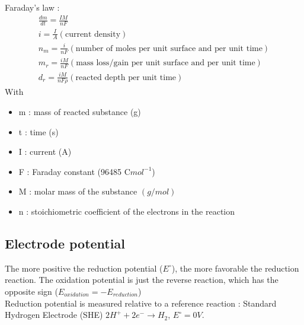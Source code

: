 \documentclass[../main.tex]{subfiles}
\begin{document}
Faraday's law : \begin{equation}
    \begin{gathered}
        \frac{dm}{dt} = \frac{IM}{nF}\\
        i = \frac{I}{A} (\text{current density})\\
        n_m = \frac{i}{nF} (\text{number of moles per unit surface and per unit time})\\
        m_r = \frac{iM}{nF} (\text{mass loss/gain per unit surface and per unit time})\\
        d_r = \frac{iM}{nF\rho} (\text{reacted depth per unit time})
    \end{gathered}
\end{equation}
With \begin{itemize}
    \item m : mass of reacted substance (g)
    \item t : time (s)
    \item I : current (A)
    \item F : Faraday constant (96485 C$mol^{-1}$)
    \item M : molar mass of the substance $(g/mol)$
    \item n : stoichiometric coefficient of the electrons in the reaction
\end{itemize}

\subsection{Electrode potential}
The more positive the reduction potential ($E^\circ$), the more favorable the reduction reaction. The oxidation potential is just the reverse reaction, which has the opposite sign ($E_{oxidation} = -E_{reduction}$)\\

Reduction potential is measured relative to a reference reaction : Standard Hydrogen Electrode (SHE) $2H^+ + 2e^- \rightarrow H_2$, $E^\circ = 0V$.\\
\end{document}
